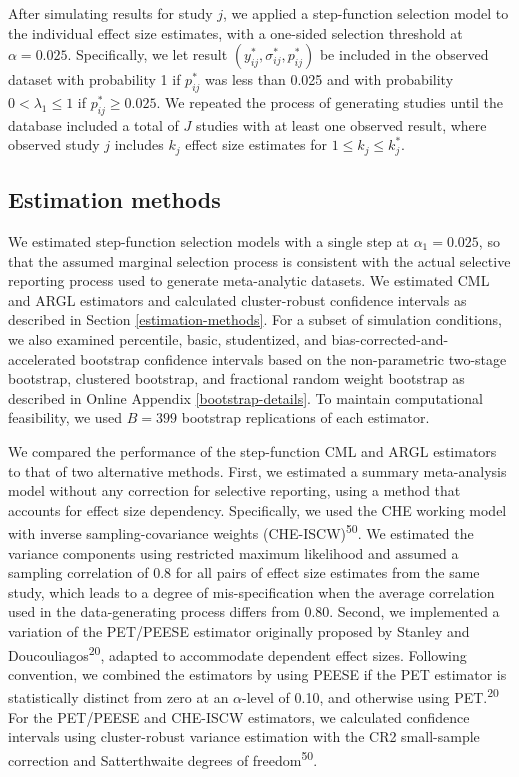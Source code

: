 \documentclass[
  american,
  man, donotrepeattitle,floatsintext]{apa7}
\begin{document}
After simulating results for study \(j\), we applied a step-function selection
model to the individual effect size estimates, with a one-sided selection
threshold at \(\alpha = 0.025\). Specifically, we let result \((y^*_{ij},
\sigma_{ij}^*, p_{ij}^*)\) be included in the observed dataset with probability
1 if \(p_{ij}^*\) was less than 0.025 and with probability \(0 < \lambda_1 \leq 1\) if \(p_{ij}^* \ge 0.025\).
We repeated the process of generating studies until the database included a total of \(J\) studies with at least one observed result, where observed study \(j\) includes \(k_j\) effect size estimates for \(1 \leq k_j \leq k_j^*\).

\subsection{Estimation methods}\label{estimation-methods-1}

We estimated step-function selection models with a single step at \(\alpha_1 = 0.025\), so that the assumed marginal selection process is consistent with the actual selective reporting process used to generate meta-analytic datasets.
We estimated CML and ARGL estimators and calculated cluster-robust confidence intervals as described in Section \ref{estimation-methods}.
For a subset of simulation conditions, we also examined percentile, basic, studentized, and bias-corrected-and-accelerated bootstrap confidence intervals based on the non-parametric two-stage bootstrap, clustered bootstrap, and fractional random weight bootstrap as described in Online Appendix \ref{bootstrap-details}.
To maintain computational feasibility, we used \(B = 399\) bootstrap replications of each estimator.

We compared the performance of the step-function CML and ARGL estimators to that of two alternative methods.
First, we estimated a summary meta-analysis model without any correction for selective reporting, using a method that accounts for effect size dependency.
Specifically, we used the CHE working model with inverse sampling-covariance weights (CHE-ISCW)\textsuperscript{50}.
We estimated the variance components using restricted maximum likelihood and assumed a sampling correlation of 0.8 for all pairs of effect size estimates from the same study, which leads to a degree of mis-specification when the average correlation used in the data-generating process differs from 0.80.
Second, we implemented a variation of the PET/PEESE estimator originally proposed by Stanley and Doucouliagos\textsuperscript{20}, adapted to accommodate dependent effect sizes.
Following convention, we combined the estimators by using PEESE if the PET estimator is statistically distinct from zero at an \(\alpha\)-level of 0.10, and otherwise using PET.\textsuperscript{20}
For the PET/PEESE and CHE-ISCW estimators, we calculated confidence intervals using cluster-robust variance estimation with the CR2 small-sample correction and Satterthwaite degrees of freedom\textsuperscript{50}.
\end{document}
